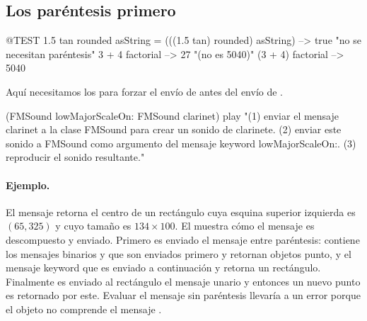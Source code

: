 \documentclass[a4paper,10pt,twoside]{book}
\begin{document}
\subsection{Los par\'entesis primero}


\begin{code}{@TEST}
1.5 tan rounded asString = (((1.5 tan) rounded) asString) --> true    "no se necesitan par\'entesis"
3 + 4 factorial   --> 27    "(no es 5040)"
(3 + 4) factorial --> 5040
\end{code}

Aquí necesitamos los  para forzar el envío de  antes del envío de .
\begin{code}{}
(FMSound lowMajorScaleOn: FMSound clarinet) play 
"(1) enviar el mensaje clarinet a la clase FMSound para crear un sonido de clarinete.
 (2) enviar este sonido a FMSound como argumento del mensaje keyword lowMajorScaleOn:.
 (3) reproducir el sonido resultante."
\end{code}



\paragraph{Ejemplo.}
El mensaje  retorna el centro de un rectángulo cuya esquina superior izquierda es $(65, 325)$ y cuyo tamaño es $134{\times}100$. El  muestra cómo el mensaje es descompuesto y enviado. Primero es enviado el mensaje entre paréntesis: contiene los mensajes binarios  y  que son enviados primero y retornan objetos punto, y el mensaje keyword  que es enviado a continuación y retorna un rectángulo. Finalmente es enviado al rectángulo el mensaje unario  y entonces un nuevo punto es retornado por este. 
Evaluar el mensaje sin paréntesis llevaría a un error porque el objeto  no comprende el mensaje .
\end{document}
